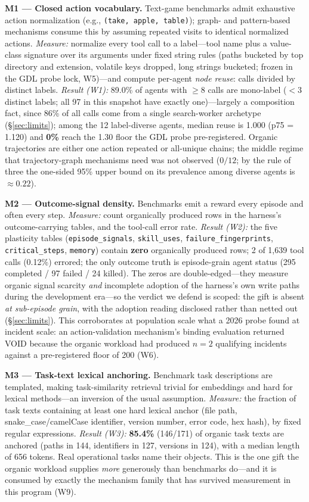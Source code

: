 \documentclass[11pt]{article}
\begin{document}
\textbf{M1 --- Closed action vocabulary.} Text-game benchmarks admit exhaustive action normalization (e.g., \texttt{(take, apple, table)}); graph- and pattern-based mechanisms consume this by assuming repeated visits to identical normalized actions. \emph{Measure:} normalize every tool call to a label---tool name plus a value-class signature over its arguments under fixed string rules (paths bucketed by top directory and extension, volatile keys dropped, long strings bucketed; frozen in the GDL probe lock, W5)---and compute per-agent \emph{node reuse}: calls divided by distinct labels. \emph{Result (W1):} 89.0\% of agents with $\geq$8 calls are mono-label ($<$3 distinct labels; all 97 in this snapshot have exactly one)---largely a composition fact, since 86\% of all calls come from a single search-worker archetype (\S\ref{sec:limits}); among the 12 label-diverse agents, median reuse is 1.000 (p75 = 1.120) and \textbf{0\%} reach the 1.30 floor the GDL probe pre-registered. Organic trajectories are either one action repeated or all-unique chains; the middle regime that trajectory-graph mechanisms need was not observed ($0/12$; by the rule of three the one-sided 95\% upper bound on its prevalence among diverse agents is $\approx 0.22$).

\textbf{M2 --- Outcome-signal density.} Benchmarks emit a reward every episode and often every step. \emph{Measure:} count organically produced rows in the harness's outcome-carrying tables, and the tool-call error rate. \emph{Result (W2):} the five plasticity tables (\texttt{episode\_signals}, \texttt{skill\_uses}, \texttt{failure\_fingerprints}, \texttt{critical\_steps}, \texttt{memory}) contain \textbf{zero} organically produced rows; 2 of 1{,}639 tool calls (0.12\%) errored; the only outcome truth is episode-grain agent status (295 completed / 97 failed / 24 killed). The zeros are double-edged---they measure organic signal scarcity \emph{and} incomplete adoption of the harness's own write paths during the development era---so the verdict we defend is scoped: the gift is absent \emph{at sub-episode grain}, with the adoption reading disclosed rather than netted out (\S\ref{sec:limits}). This corroborates at population scale what a 2026 probe found at incident scale: an action-validation mechanism's binding evaluation returned VOID because the organic workload had produced $n{=}2$ qualifying incidents against a pre-registered floor of 200 (W6).

\textbf{M3 --- Task-text lexical anchoring.} Benchmark task descriptions are templated, making task-similarity retrieval trivial for embeddings and hard for lexical methods---an inversion of the usual assumption. \emph{Measure:} the fraction of task texts containing at least one hard lexical anchor (file path, snake\_case/camelCase identifier, version number, error code, hex hash), by fixed regular expressions. \emph{Result (W3):} \textbf{85.4\%} (146/171) of organic task texts are anchored (paths in 144, identifiers in 127, versions in 124), with a median length of 656 tokens. Real operational tasks name their objects. This is the one gift the organic workload supplies \emph{more} generously than benchmarks do---and it is consumed by exactly the mechanism family that has survived measurement in this program (W9).
\end{document}
